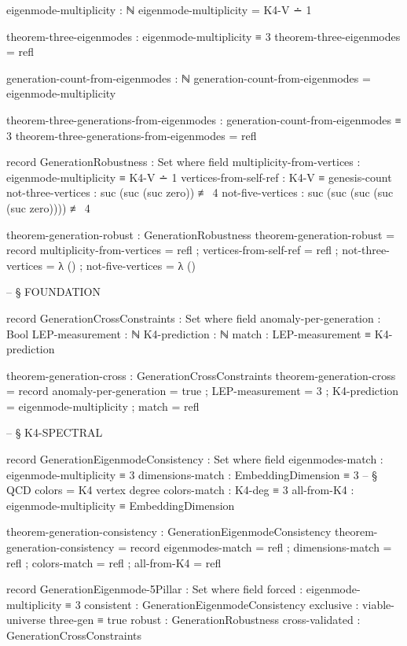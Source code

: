 \documentclass[11pt,a4paper]{book}
\begin{document}
\begin{code}
eigenmode-multiplicity : ℕ
eigenmode-multiplicity = K4-V ∸ 1

theorem-three-eigenmodes : eigenmode-multiplicity ≡ 3
theorem-three-eigenmodes = refl

generation-count-from-eigenmodes : ℕ
generation-count-from-eigenmodes = eigenmode-multiplicity

theorem-three-generations-from-eigenmodes : generation-count-from-eigenmodes ≡ 3
theorem-three-generations-from-eigenmodes = refl

record GenerationRobustness : Set where
  field
    multiplicity-from-vertices : eigenmode-multiplicity ≡ K4-V ∸ 1
    vertices-from-self-ref     : K4-V ≡ genesis-count
    not-three-vertices         : suc (suc (suc zero)) ≢ 4
    not-five-vertices          : suc (suc (suc (suc (suc zero)))) ≢ 4

theorem-generation-robust : GenerationRobustness
theorem-generation-robust = record
  { multiplicity-from-vertices = refl
  ; vertices-from-self-ref     = refl
  ; not-three-vertices         = λ ()
  ; not-five-vertices          = λ ()
  }


-- § FOUNDATION

record GenerationCrossConstraints : Set where
  field
    anomaly-per-generation : Bool
    LEP-measurement        : ℕ
    K4-prediction          : ℕ
    match                  : LEP-measurement ≡ K4-prediction

theorem-generation-cross : GenerationCrossConstraints
theorem-generation-cross = record
  { anomaly-per-generation = true
  ; LEP-measurement        = 3
  ; K4-prediction          = eigenmode-multiplicity
  ; match                  = refl
  }


-- § K4-SPECTRAL

record GenerationEigenmodeConsistency : Set where
  field
    eigenmodes-match : eigenmode-multiplicity ≡ 3
    dimensions-match : EmbeddingDimension ≡ 3
    -- § QCD colors = K4 vertex degree
    colors-match     : K4-deg ≡ 3
    all-from-K4      : eigenmode-multiplicity ≡ EmbeddingDimension

theorem-generation-consistency : GenerationEigenmodeConsistency
theorem-generation-consistency = record
  { eigenmodes-match = refl
  ; dimensions-match = refl
  ; colors-match     = refl
  ; all-from-K4      = refl
  }

record GenerationEigenmode-5Pillar : Set where
  field
    forced           : eigenmode-multiplicity ≡ 3
    consistent       : GenerationEigenmodeConsistency
    exclusive        : viable-universe three-gen ≡ true
    robust           : GenerationRobustness
    cross-validated  : GenerationCrossConstraints


\end{code}
\end{document}
